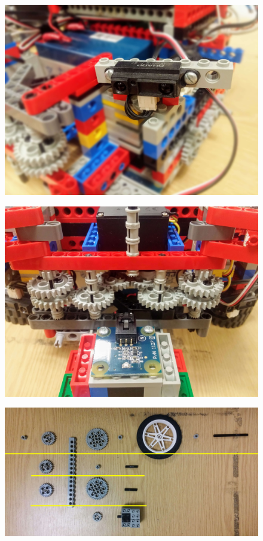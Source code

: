 \begin{figure}[ht]
    \centering
    \includegraphics[width=0.7\linewidth]{res/robot-pics/ir-sensor-placement.jpg}
    \caption{}
    \label{fig:}
\end{figure}

\begin{figure}[ht]
    \centering
    \includegraphics[width=0.7\linewidth]{res/robot-pics/gripper-gear-train.jpg}
    \caption{}
    \label{fig:}
\end{figure}

\begin{figure}[ht]
    \centering
    \includegraphics[width=0.7\linewidth]{res/robot-pics/gear-train-unmounted.jpg}
    \caption{}
    \label{fig:}
\end{figure}

